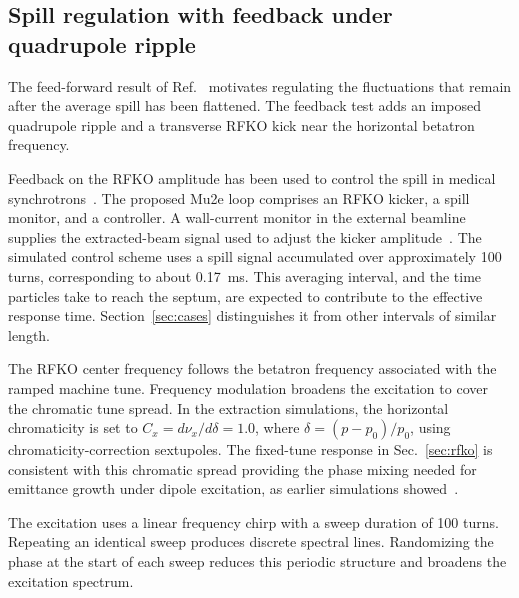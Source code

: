 \documentclass[a4paper,fleqn]{cas-sc}
\begin{document}
\subsection{\label{sec:rfko1}Spill regulation with feedback under quadrupole ripple}

The feed-forward result of Ref.~\cite{mu2e} motivates regulating the fluctuations that remain after the average spill has been flattened. The feedback test adds an imposed quadrupole ripple and a transverse RFKO kick near the horizontal betatron frequency.

Feedback on the RFKO amplitude has been used to control the spill in medical synchrotrons~\cite{furukawa}. The proposed Mu2e loop comprises an RFKO kicker, a spill monitor, and a controller. A wall-current monitor in the external beamline supplies the extracted-beam signal used to adjust the kicker amplitude~\cite{wcm,rfkoreg}. The simulated control scheme uses a spill signal accumulated over approximately 100 turns, corresponding to about \SI{0.17}{\milli\second}. This averaging interval, and the time particles take to reach the septum, are expected to contribute to the effective response time. Section~\ref{sec:cases} distinguishes it from other intervals of similar length.

The RFKO center frequency follows the betatron frequency associated with the ramped machine tune. Frequency modulation broadens the excitation to cover the chromatic tune spread. In the extraction simulations, the horizontal chromaticity is set to $C_x=d\nu_x/d\delta=1.0$, where $\delta=(p-p_0)/p_0$, using chromaticity-correction sextupoles. The fixed-tune response in Sec.~\ref{sec:rfko} is consistent with this chromatic spread providing the phase mixing needed for emittance growth under dipole excitation, as earlier simulations showed~\cite{ipac11}.

The excitation uses a linear frequency chirp with a sweep duration of 100 turns. Repeating an identical sweep produces discrete spectral lines. Randomizing the phase at the start of each sweep reduces this periodic structure and broadens the excitation spectrum.
\end{document}
